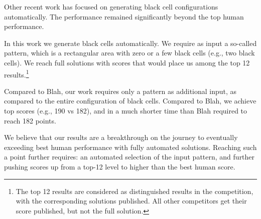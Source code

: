 Other recent work has focused on generating black cell configurations
automatically. The performance remained significantly beyond
the top human performance.

In this work we generate black cells automatically.
We require as input a so-called pattern, which is a
rectangular area with zero or a few black cells (e.g., two black cells).
We reach full solutions with scores that would place us among the top 12
results.\footnote{The top 12 results are considered as distinguished
results in the competition, with the corresponding solutions published.
All other competitors get their score published, but not the full solution.}

Compared to Blah, our work requires only a pattern as additional input,
as compared to the entire configuration of black cells.
Compared to Blah, we achieve top scores (e.g., 190 vs 182), and in a much shorter time
than Blah required to reach 182 points.

We believe that our results are a breakthrough on the journey to eventually
exceeding best human performance with fully automated solutions.
Reaching such a point further requires: an automated selection of the input pattern,
and further pushing scores up from a top-12 level to higher than the best human score.

